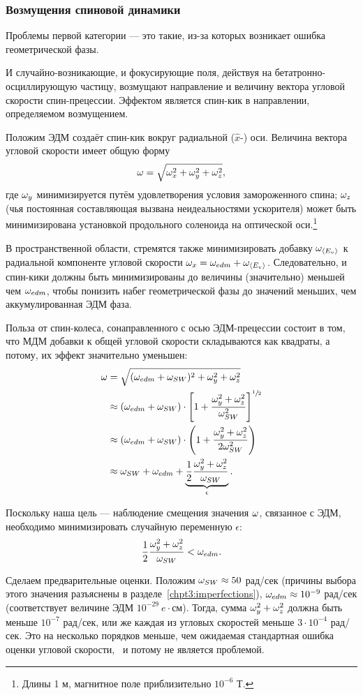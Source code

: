 \subsubsection{Возмущения спиновой динамики}
Проблемы первой категории --- это такие, из-за которых возникает ошибка геометрической фазы.

И случайно-возникающие, и фокусирующие поля, действуя на бетатронно-осциллирующую частицу,
возмущают направление и величину вектора угловой скорости спин-прецессии. Эффектом является
спин-кик в направлении, определяемом возмущением.

Положим ЭДМ создаёт спин-кик вокруг радиальной ($\hat x$-) оси. Величина вектора угловой скорости
имеет общую форму
\[
\omega = \sqrt{\omega_x^2 + \omega_y^2 + \omega_z^2},
\]
где  $\omega_y$ минимизируется путём удовлетворения условия замороженного спина; $\omega_z$ (чья постоянная
составляющая вызвана неидеальностями ускорителя) может быть минимизирована установкой продольного 
соленоида на оптической оси.\footnote{Длины 1 м, магнитное поле приблизительно $10^{-6}$ Т.}

В пространственной области, стремятся также минимизировать добавку $\wimp$ к радиальной компоненте
угловой скорости $\w_x = \w_{edm} + \wimp$. Следовательно, и спин-кики должны быть минимизированы до
величины (значительно) меньшей чем $\omega_{edm}$, чтобы понизить набег геометрической фазы до значений
меньших, чем аккумулированная ЭДМ фаза.

Польза от спин-колеса, сонаправленного с осью ЭДМ-прецессии состоит в том, что
МДМ добавки к общей угловой скорости складываются как квадраты, а потому, их эффект значительно уменьшен:
\begin{align*}
	\w &= \sqrt{(\wedm + \wsw)^2 + \w_y^2 + \w_z^2} \\
	&\approx (\wedm+\wsw)\cdot\bkt*{1 + \frac{\w_y^2 + \w_z^2}{\wsw^2}}^{\sfrac12} \\
	&\approx (\wedm + \wsw)\cdot \bkt{1 + \frac{\w_y^2 + \w_z^2}{2\wsw^2}} \\
	&\approx \wsw + \wedm + \underbrace{\frac12\frac{\w_y^2 + \w_z^2}{\wsw}}_{\epsilon}.
\end{align*}

Поскольку наша цель --- наблюдение смещения значения $\omega$, связанное с ЭДМ, необходимо 
минимизировать случайную переменную $\epsilon$:
\[
\frac12\frac{\omega_y^2+\omega_z^2}{\omega_{SW}} < \omega_{edm}.
\]

Сделаем предварительные оценки. Положим $\omega_{SW}\approx 50$ рад/сек (причины выбора этого значения
разъяснены в разделе~\ref{chpt3:imperfections}), $\omega_{edm}\approx 10^{-9}$ рад/сек (соответствует величине
ЭДМ $10^{-29}~e\cdot$см). Тогда, сумма $\omega_y^2 + \omega_z^2$ должна быть меньше $10^{-7}$ рад/сек, или
же каждая из угловых скоростей меньше $3\cdot 10^{-4}$ рад/сек. Это на несколько порядков меньше,
чем ожидаемая стандартная ошибка оценки угловой скорости,~\cite{Aksentev:Stats} и потому не является проблемой.

